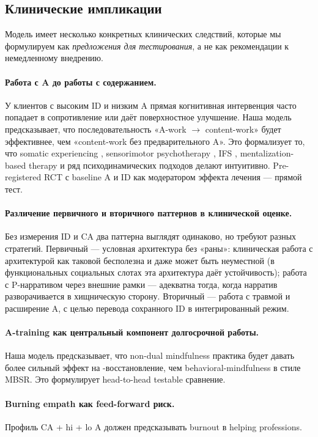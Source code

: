 \subsection{Клинические импликации}
\label{subsec:clinical}

Модель имеет несколько конкретных клинических следствий, которые мы формулируем как \emph{предложения для тестирования}, а не как рекомендации к немедленному внедрению.

\paragraph{Работа с A до работы с содержанием.} У клиентов с высоким ID и низким A прямая когнитивная интервенция часто попадает в сопротивление или даёт поверхностное улучшение. Наша модель предсказывает, что последовательность «A-work $\to$ content-work» будет эффективнее, чем «content-work без предварительного A». Это формализует то, что somatic experiencing \citep{levine2015}, sensorimotor psychotherapy \citep{ogden2006}, IFS \citep{schwartz1995}, mentalization-based therapy \citep{fonagy2008} и ряд психодинамических подходов делают интуитивно. Pre-registered RCT с baseline A и ID как модератором эффекта лечения --- прямой тест.

\paragraph{Различение первичного и вторичного паттернов в клинической оценке.} Без измерения ID и CA два паттерна выглядят одинаково, но требуют разных стратегий. Первичный --- условная архитектура без «раны»: клиническая работа с архитектурой как таковой бесполезна и даже может быть неуместной (в функциональных социальных слотах эта архитектура даёт устойчивость); работа с P-нарративом через внешние рамки --- адекватна тогда, когда нарратив разворачивается в хищническую сторону. Вторичный --- работа с травмой и расширение A, с целью перевода сохранного ID в интегрированный режим.

\paragraph{A-training как центральный компонент долгосрочной работы.} Наша модель предсказывает, что non-dual mindfulness практика будет давать более сильный эффект на \EAF{}-восстановление, чем behavioral-mindfulness в стиле MBSR. Это формулирует head-to-head testable сравнение.

\paragraph{Burning empath как feed-forward риск.} Профиль CA + hi \EAF{} + lo A должен предсказывать burnout в helping professions.

